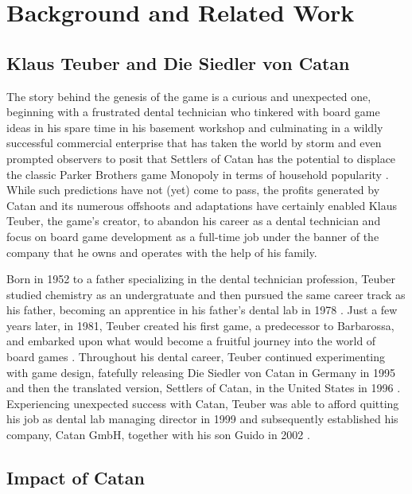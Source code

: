 \documentclass[pageno]{jpaper}
\begin{document}
\begin{doublespacing}
\hypertarget{sec:background_and_related_work}{}
\section{Background and Related Work}

\hypertarget{sec:klaus_teuber_and_die_siedler_von_catan}{}
\subsection{Klaus Teuber and Die Siedler von Catan}

The story behind the genesis of the game is a curious and unexpected one, beginning with a frustrated dental technician who tinkered with board game ideas in his spare time in his basement workshop and culminating in a wildly successful commercial enterprise that has taken the world by storm and even prompted observers to posit that Settlers of Catan has the potential to displace the classic Parker Brothers game Monopoly in terms of household popularity \cite{raphel2014}. While such predictions have not (yet) come to pass, the profits generated by Catan and its numerous offshoots and adaptations have certainly enabled Klaus Teuber, the game's creator, to abandon his career as a dental technician and focus on board game development as a full-time job under the banner of the company that he owns and operates with the help of his family.

Born in 1952 to a father specializing in the dental technician profession, Teuber studied chemistry as an undergratuate and then pursued the same career track as his father, becoming an apprentice in his father's dental lab in 1978 \cite{catanwebabout}. Just a few years later, in 1981, Teuber created his first game, a predecessor to Barbarossa, and embarked upon what would become a fruitful journey into the world of board games \cite{catanwebabout}. Throughout his dental career, Teuber continued experimenting with game design, fatefully releasing Die Siedler von Catan in Germany in 1995 and then the translated version, Settlers of Catan, in the United States in 1996 \cite{raphel2014}. Experiencing unexpected success with Catan, Teuber was able to afford quitting his job as dental lab managing director in 1999 and subsequently established his company, Catan GmbH, together with his son Guido in 2002 \cite{catanwebabout}.

\hypertarget{sec:impact_of_catan}{}
\subsection{Impact of Catan}


\end{doublespacing}
\end{document}
